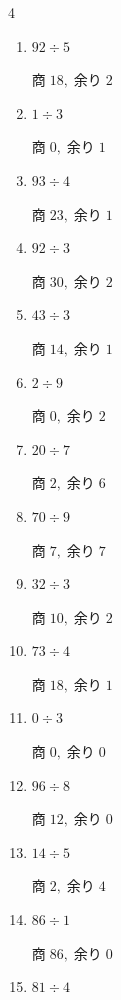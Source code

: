 \begin{multicols}{4}
\begin{enumerate}
        $商\; 3,\; 余り\; 0$

  \item $92 \div 5$

        $商\; 18,\; 余り\; 2$

  \item $1 \div 3$

        $商\; 0,\; 余り\; 1$

  \item $93 \div 4$

        $商\; 23,\; 余り\; 1$

  \item $92 \div 3$

        $商\; 30,\; 余り\; 2$

  \item $43 \div 3$

        $商\; 14,\; 余り\; 1$

  \item $2 \div 9$

        $商\; 0,\; 余り\; 2$

  \item $20 \div 7$

        $商\; 2,\; 余り\; 6$

  \item $70 \div 9$

        $商\; 7,\; 余り\; 7$

  \item $32 \div 3$

        $商\; 10,\; 余り\; 2$

\columnbreak %

  \item $73 \div 4$

        $商\; 18,\; 余り\; 1$

  \item $0 \div 3$

        $商\; 0,\; 余り\; 0$

  \item $96 \div 8$

        $商\; 12,\; 余り\; 0$

  \item $14 \div 5$

        $商\; 2,\; 余り\; 4$

  \item $86 \div 1$

        $商\; 86,\; 余り\; 0$

  \item $81 \div 4$


\end{enumerate}
\end{multicols}
